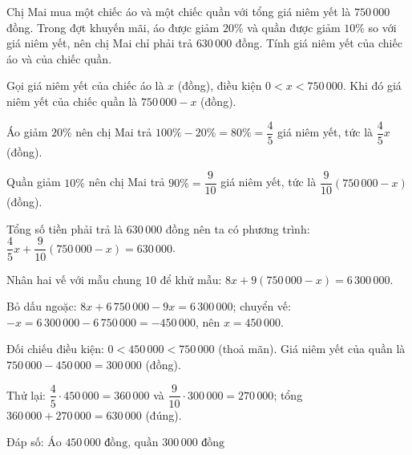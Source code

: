 \begin{problem}[8DS-PT1-016]
Chị Mai mua một chiếc áo và một chiếc quần với tổng giá niêm yết là $750\,000$ đồng. Trong đợt khuyến mãi, áo được giảm $20\%$ và quần được giảm $10\%$ so với giá niêm yết, nên chị Mai chỉ phải trả $630\,000$ đồng. Tính giá niêm yết của chiếc áo và của chiếc quần.

\begin{solution}
Gọi giá niêm yết của chiếc áo là $x$ (đồng), điều kiện $0 < x < 750\,000$. Khi đó giá niêm yết của chiếc quần là $750\,000 - x$ (đồng).

Áo giảm $20\%$ nên chị Mai trả $100\% - 20\% = 80\% = \dfrac{4}{5}$ giá niêm yết, tức là $\dfrac{4}{5}x$ (đồng).

Quần giảm $10\%$ nên chị Mai trả $90\% = \dfrac{9}{10}$ giá niêm yết, tức là $\dfrac{9}{10}(750\,000 - x)$ (đồng).

Tổng số tiền phải trả là $630\,000$ đồng nên ta có phương trình: $\dfrac{4}{5}x + \dfrac{9}{10}(750\,000 - x) = 630\,000$.

Nhân hai vế với mẫu chung $10$ để khử mẫu: $8x + 9(750\,000 - x) = 6\,300\,000$.

Bỏ dấu ngoặc: $8x + 6\,750\,000 - 9x = 6\,300\,000$; chuyển vế: $-x = 6\,300\,000 - 6\,750\,000 = -450\,000$, nên $x = 450\,000$.

Đối chiếu điều kiện: $0 < 450\,000 < 750\,000$ (thoả mãn). Giá niêm yết của quần là $750\,000 - 450\,000 = 300\,000$ (đồng).

Thử lại: $\dfrac{4}{5} \cdot 450\,000 = 360\,000$ và $\dfrac{9}{10} \cdot 300\,000 = 270\,000$; tổng $360\,000 + 270\,000 = 630\,000$ (đúng).

Đáp số: $\boxed{\text{Áo } 450\,000 \text{ đồng, quần } 300\,000 \text{ đồng}}$
\end{solution}
\end{problem}

